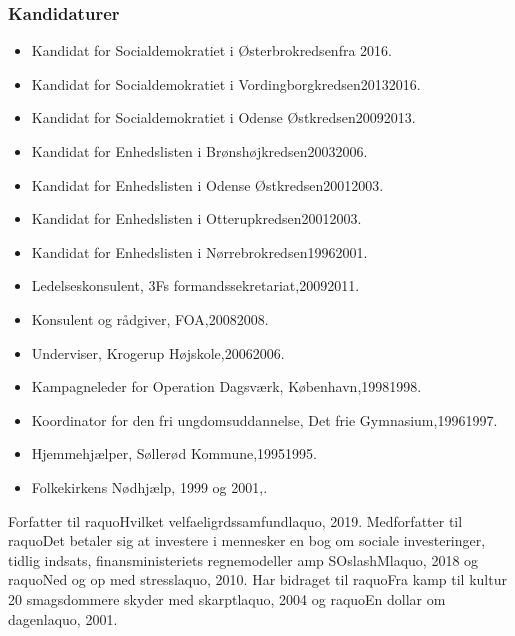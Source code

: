 \documentclass[11pt, a4paper]{awesome-cv}
\begin{document}
\begin{cvletter}
\subsubsection*{Kandidaturer}
\begin{itemize}
\item Kandidat for Socialdemokratiet i Østerbrokredsenfra 2016.
\item Kandidat for Socialdemokratiet i Vordingborgkredsen20132016.
\item Kandidat for Socialdemokratiet i Odense Østkredsen20092013.
\item Kandidat for Enhedslisten i Brønshøjkredsen20032006.
\item Kandidat for Enhedslisten i Odense Østkredsen20012003.
\item Kandidat for Enhedslisten i Otterupkredsen20012003.
\item Kandidat for Enhedslisten i Nørrebrokredsen19962001.
\end{itemize}
\begin{itemize}
\item Ledelseskonsulent, 3Fs formandssekretariat,20092011.
\item Konsulent og rådgiver, FOA,20082008.
\item Underviser, Krogerup Højskole,20062006.
\item Kampagneleder for Operation Dagsværk, København,19981998.
\item Koordinator for den fri ungdomsuddannelse, Det frie Gymnasium,19961997.
\item Hjemmehjælper, Søllerød Kommune,19951995.
\item Folkekirkens Nødhjælp, 1999 og 2001,.
\end{itemize}
Forfatter til raquoHvilket velfaeligrdssamfundlaquo, 2019. Medforfatter til raquoDet betaler sig at investere i mennesker  en bog om sociale investeringer, tidlig indsats, finansministeriets regnemodeller amp SOslashMlaquo, 2018 og raquoNed og op med stresslaquo, 2010. Har bidraget til raquoFra kamp til kultur  20 smagsdommere skyder med skarptlaquo, 2004 og raquoEn dollar om dagenlaquo, 2001.

\end{cvletter}
\end{document}
